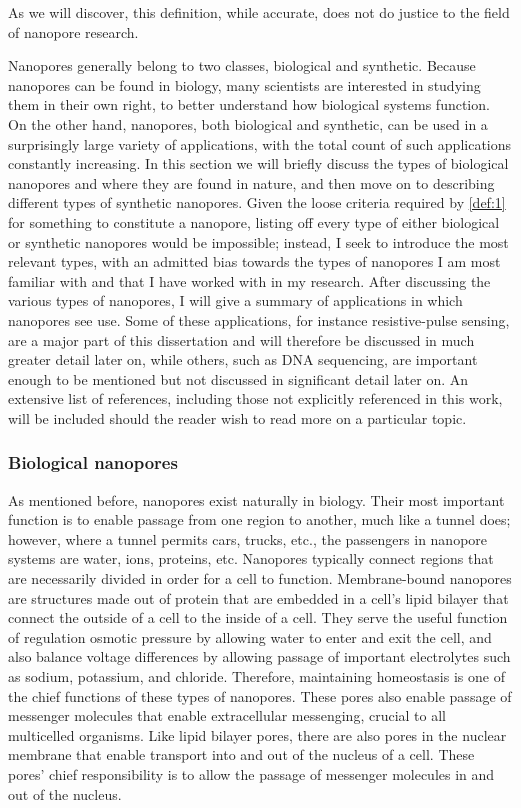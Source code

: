 \documentclass[a4paper,10pt]{article}
\theoremstyle{definition}
\theoremstyle{remark}
\begin{document}
As we will discover, this definition, while accurate, does not do justice to the field of nanopore research. 

Nanopores generally belong to two classes, biological and synthetic. Because nanopores can be found in biology, many scientists are interested in studying them in their own right, to better understand how biological systems function. On the other hand, nanopores, both biological and synthetic, can be used in a surprisingly large variety of applications, with the total count of such applications constantly increasing. In this section we will briefly discuss the types of biological nanopores and where they are found in nature, and then move on to describing different types of synthetic nanopores. Given the loose criteria required by \ref{def:1} for something to constitute a nanopore, listing off every type of either biological or synthetic nanopores would be impossible; instead, I seek to introduce the most relevant types, with an admitted bias towards the types of nanopores I am most familiar with and that I have worked with in my research. After discussing the various types of nanopores, I will give a summary of applications in which nanopores see use. Some of these applications, for instance resistive-pulse sensing, are a major part of this dissertation and will therefore be discussed in much greater detail later on, while others, such as DNA sequencing, are important enough to be mentioned but not discussed in significant detail later on. An extensive list of references, including those not explicitly referenced in this work, will be included should the reader wish to read more on a particular topic.

\subsubsection{Biological nanopores}

As mentioned before, nanopores exist naturally in biology. Their most important function is to enable passage from one region to another, much like a tunnel does; however, where a tunnel permits cars, trucks, etc., the passengers in nanopore systems are water, ions, proteins, etc. Nanopores typically connect regions that are necessarily divided in order for a cell to function. Membrane-bound nanopores are structures made out of protein that are embedded in a cell's lipid bilayer that connect the outside of a cell to the inside of a cell. They serve the useful function of regulation osmotic pressure by allowing water to enter and exit the cell, and also balance voltage differences by allowing passage of important electrolytes such as sodium, potassium, and chloride. Therefore, maintaining homeostasis is one of the chief functions of these types of nanopores. These pores also enable passage of messenger molecules that enable extracellular messenging, crucial to all multicelled organisms. Like lipid bilayer pores, there are also pores in the nuclear membrane that enable transport into and out of the nucleus of a cell. These pores' chief responsibility is to allow the passage of messenger molecules in and out of the nucleus. 
\end{document}
